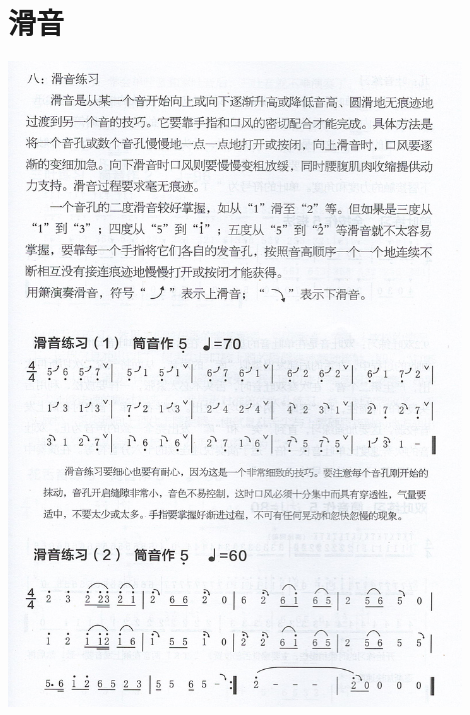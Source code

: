 \documentclass[cn,pad,twocol]{elegantbook}
\begin{document}
\section{滑音}                  \includegraphics[width=0.9\textwidth]{dongxiao/Scan 14.jpeg}
\end{document}
